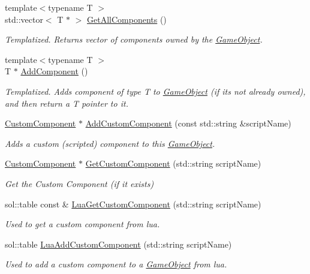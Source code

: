 \begin{DoxyCompactItemize}
{\footnotesize template$<$typename T $>$ }\\std\+::vector$<$ T $\ast$ $>$ \hyperlink{classGameObject_a0962252e1ed643ec1fde58da7dec4c2c}{Get\+All\+Components} ()
\begin{DoxyCompactList}\small\item\em Templatized. Returns vector of components owned by the \hyperlink{classGameObject}{Game\+Object}. \end{DoxyCompactList}\item 
{\footnotesize template$<$typename T $>$ }\\T $\ast$ \hyperlink{classGameObject_a811dc08b79009b3af153721df972e761}{Add\+Component} ()
\begin{DoxyCompactList}\small\item\em Templatized. Adds component of type T to \hyperlink{classGameObject}{Game\+Object} (if its not already owned), and then return a T pointer to it. \end{DoxyCompactList}\item 
\hyperlink{classCustomComponent}{Custom\+Component} $\ast$ \hyperlink{classGameObject_ad388a379be13bf21977558f1e00906c3}{Add\+Custom\+Component} (const std\+::string \&script\+Name)
\begin{DoxyCompactList}\small\item\em Adds a custom (scripted) component to this \hyperlink{classGameObject}{Game\+Object}. \end{DoxyCompactList}\item 
\hyperlink{classCustomComponent}{Custom\+Component} $\ast$ \hyperlink{classGameObject_af5b410a717cc1b1b1729684f75a73f36}{Get\+Custom\+Component} (std\+::string script\+Name)
\begin{DoxyCompactList}\small\item\em Get the Custom Component (if it exists) \end{DoxyCompactList}\item 
sol\+::table const  \& \hyperlink{classGameObject_a7838788ee6710528dbcb58e1c6400079}{Lua\+Get\+Custom\+Component} (std\+::string script\+Name)
\begin{DoxyCompactList}\small\item\em Used to get a custom component from lua. \end{DoxyCompactList}\item 
sol\+::table \hyperlink{classGameObject_a6fbe224c7ecc5562df50fccbaae30658}{Lua\+Add\+Custom\+Component} (std\+::string script\+Name)
\begin{DoxyCompactList}\small\item\em Used to add a custom component to a \hyperlink{classGameObject}{Game\+Object} from lua. \end{DoxyCompactList}\item 

\end{DoxyCompactItemize}
